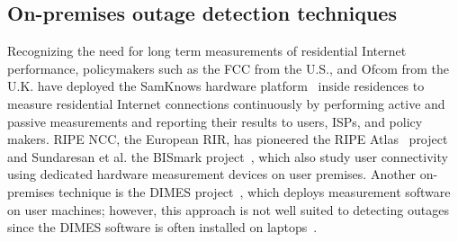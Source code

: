 






\subsection{On-premises outage detection techniques}

Recognizing the need for long term
measurements of residential Internet performance, policymakers such as
the FCC from the U.S., and Ofcom from the U.K. have deployed the SamKnows
hardware platform~\cite{samknows} inside residences to measure residential
Internet connections continuously by performing active and passive
measurements and reporting their results to users, ISPs, and
policy makers. RIPE NCC, the European RIR, has pioneered the RIPE Atlas~\cite{atlas} project and
Sundaresan et al. the BISmark project~\cite{bismark-main-bib}, which also study
user connectivity using dedicated hardware measurement devices on user premises. Another
on-premises technique is the DIMES project~\cite{netdimes}, which
deploys measurement software on user machines; however, this approach
is not well suited to detecting outages since the DIMES software is
often installed on laptops~\cite{dhcp-dimes}.

